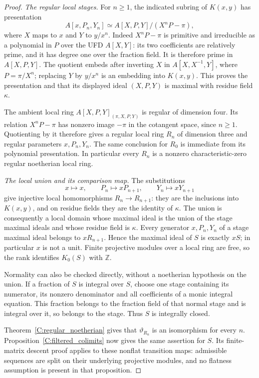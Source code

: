\begin{proof}
\emph{The regular local stages.}
For $n\geq1$, the indicated subring of $K(x,y)$ has presentation
\[
 A[x,P_n,Y_n]\simeq
 A[X,P,Y]/(X^nP-\pi),                           \tag{C.1.NC2}
\]
where $X$ maps to $x$ and $Y$ to $y/x^n$.
Indeed $X^nP-\pi$ is primitive and irreducible as a
polynomial in $P$ over the UFD $A[X,Y]$: its two
coefficients are relatively prime, and it has degree one
over the fraction field.
It is therefore prime in $A[X,P,Y]$.
The quotient embeds after inverting $X$ in
$A[X,X^{-1},Y]$, where $P=\pi/X^n$; replacing $Y$ by
$y/x^n$ is an embedding into $K(x,y)$.
This proves the presentation and that its displayed ideal
$(X,P,Y)$ is maximal with residue field $\kappa$.

The ambient local ring
$A[X,P,Y]_{(\pi,X,P,Y)}$ is regular of dimension four.
Its relation $X^nP-\pi$ has nonzero image $-\pi$ in the
cotangent space, since $n\geq1$.
Quotienting by it therefore gives a regular local ring
$R_n$ of dimension three and regular parameters
$x,P_n,Y_n$.
The same conclusion for $R_0$ is immediate from its
polynomial presentation.  In particular every $R_n$ is
a nonzero characteristic-zero regular noetherian local ring.

\emph{The local union and its comparison map.}
The substitutions
\[
 x\longmapsto x,\qquad
 P_n\longmapsto xP_{n+1},\qquad
 Y_n\longmapsto xY_{n+1}                         \tag{C.1.NC3}
\]
give injective local homomorphisms $R_n\to R_{n+1}$:
they are the inclusions into $K(x,y)$, and on residue
fields they are the identity of $\kappa$.
The union is consequently a local domain whose maximal
ideal is the union of the stage maximal ideals and whose
residue field is $\kappa$.
Every generator $x,P_n,Y_n$ of a stage maximal ideal belongs
to $xR_{n+1}$.  Hence the maximal ideal of $S$ is exactly
$xS$; in particular $x$ is not a unit.
Finite projective modules over a local ring are free, so
the rank identifies $K_0(S)$ with $\mathbb Z$.

Normality can also be checked directly, without a
noetherian hypothesis on the union.  If a fraction of $S$
is integral over $S$, choose one stage containing its
numerator, its nonzero denominator and all coefficients
of a monic integral equation.
This fraction belongs to the fraction field of that
normal stage and is integral over it, so belongs to the
stage.  Thus $S$ is integrally closed.

Theorem~\ref{C:regular_noetherian} gives that
$\vartheta_{R_n}$ is an isomorphism for every $n$.
Proposition~\ref{C:filtered_colimits} now gives the same
assertion for $S$.  Its finite-matrix descent proof applies
to these nonflat transition maps: admissible sequences
are split on their underlying projective modules, and
no flatness assumption is present in that proposition.


\end{proof}
